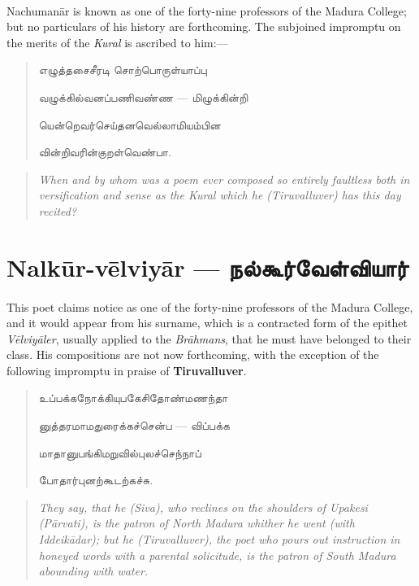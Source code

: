 \documentclass{article}
\newcommand{\TamilText}[1]{\texttamil{#1}}
\newcommand{\TamilBold}[1]{\texttamil{\textbf{#1}}}
\newcommand{\tam}[1]{\TamilText{#1}}
\newcommand{\tambold}[1]{\TamilBold{#1}}
\begin{document}
\paragraph{}
Nachuman\={a}r is known as one of the forty-nine professors of the Madura College; but no particulars of his history are forthcoming. The subjoined impromptu on the merits of the \emph{Kural} is ascribed to him:---
\begin{quotation}\small
\tam{எழுத்தசைசீரடி சொற்பொருள்யாப்பு}

\tam{வழுக்கில்வனப்பணிவண்ண} --- \tam{மிழுக்கின்றி}

\tam{யென்றெவர்செய்தனவெல்லாமியம்பின}

\tam{வின்றிவரின்குறள்வெண்பா}.
\end{quotation}
\begin{quotation}\small
\emph{When and by whom was a poem ever composed so entirely faultless both in versification and sense as the Kural which he (Tiruvalluver) has this day recited?}
\end{quotation}

\section{Nalk\={u}r-v\={e}lviy\={a}r --- \tambold{நல்கூர்வேள்வியார்}}
\paragraph{}
This poet claims notice as one of the forty-nine professors of the Madura College, and it would appear from his surname, which is a contracted form of the epithet \emph{V\={e}lviy\={a}ler}, usually applied to the \emph{Br\={a}hmans}, that he must have belonged to their class. His compositions are not now forthcoming, with the exception of the following impromptu in praise of \textbf{Tiruvalluver}.
\begin{quotation}\small
\tam{உப்பக்கநோக்கியுபகேசிதோண்‌மணந்தா}

\tam{னுத்தரமாமதுரைக்கச்சென்ப} --- \tam{விப்பக்க}

\tam{மாதானுபங்கிமறுவில்புலச்செந்நாப்‌}

\tam{போதார்புனற்கூடற்கச்சு}.
\end{quotation}
\begin{quotation}\small
\emph{They say, that he (Siva), who reclines on the shoulders of Upakesi (P\={a}rvati), is the patron of North Madura whither he went (with Iddeik\={a}dar); but he (Tiruvalluver), the poet who pours out instruction in honeyed words with a parental solicitude, is the patron of South Madura abounding with water.}
\end{quotation}
\end{document}
